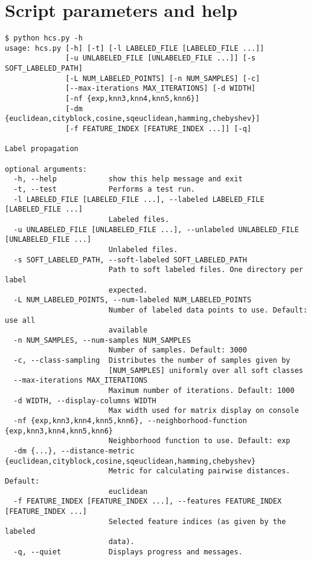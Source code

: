 \documentclass[oneside, a4paper, draft]{memoir} %
\begin{document}
\begin{figure}[here]

\end{figure}

\chapter{Script parameters and help}\label{app:codehelp}
\small
{}
\begin{verbatim}
$ python hcs.py -h
usage: hcs.py [-h] [-t] [-l LABELED_FILE [LABELED_FILE ...]]
              [-u UNLABELED_FILE [UNLABELED_FILE ...]] [-s SOFT_LABELED_PATH]
              [-L NUM_LABELED_POINTS] [-n NUM_SAMPLES] [-c]
              [--max-iterations MAX_ITERATIONS] [-d WIDTH]
              [-nf {exp,knn3,knn4,knn5,knn6}]
              [-dm {euclidean,cityblock,cosine,sqeuclidean,hamming,chebyshev}]
              [-f FEATURE_INDEX [FEATURE_INDEX ...]] [-q]

Label propagation

optional arguments:
  -h, --help            show this help message and exit
  -t, --test            Performs a test run.
  -l LABELED_FILE [LABELED_FILE ...], --labeled LABELED_FILE [LABELED_FILE ...]
                        Labeled files.
  -u UNLABELED_FILE [UNLABELED_FILE ...], --unlabeled UNLABELED_FILE [UNLABELED_FILE ...]
                        Unlabeled files.
  -s SOFT_LABELED_PATH, --soft-labeled SOFT_LABELED_PATH
                        Path to soft labeled files. One directory per label
                        expected.
  -L NUM_LABELED_POINTS, --num-labeled NUM_LABELED_POINTS
                        Number of labeled data points to use. Default: use all
                        available
  -n NUM_SAMPLES, --num-samples NUM_SAMPLES
                        Number of samples. Default: 3000
  -c, --class-sampling  Distributes the number of samples given by
                        [NUM_SAMPLES] uniformly over all soft classes
  --max-iterations MAX_ITERATIONS
                        Maximum number of iterations. Default: 1000
  -d WIDTH, --display-columns WIDTH
                        Max width used for matrix display on console
  -nf {exp,knn3,knn4,knn5,knn6}, --neighborhood-function {exp,knn3,knn4,knn5,knn6}
                        Neighborhood function to use. Default: exp
  -dm {...}, --distance-metric {euclidean,cityblock,cosine,sqeuclidean,hamming,chebyshev}
                        Metric for calculating pairwise distances. Default:
                        euclidean
  -f FEATURE_INDEX [FEATURE_INDEX ...], --features FEATURE_INDEX [FEATURE_INDEX ...]
                        Selected feature indices (as given by the labeled
                        data).
  -q, --quiet           Displays progress and messages.
\end{verbatim}
\end{document}
